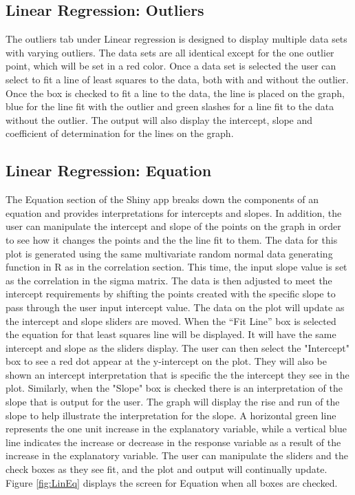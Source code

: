 \documentclass[11pt]{book}
\begin{document}
\subsection{Linear Regression: Outliers}
 
 The outliers tab under Linear regression is designed to display multiple data sets with varying outliers.  The data sets are all identical except for the one outlier point, which will be set in a red color.  Once a data set is selected the user can select to fit a line of least squares to the data, both with and without the outlier.  Once the box is checked to fit a line to the data, the line is placed on the graph, blue for the line fit with the outlier and green slashes for a line fit to the data without the outlier. The output will also display the intercept, slope and coefficient of determination for the lines on the graph.  
 

\subsection{Linear Regression: Equation}

The Equation section of the Shiny app breaks down the components of an equation and provides interpretations for intercepts and slopes.  In addition, the user can manipulate the intercept and slope of the points on the graph in order to see how it changes the points and the the line fit to them.  The data for this plot is generated using the same multivariate random normal data generating function in R as in the correlation section. This time, the input slope value is set as the correlation in the sigma matrix. The data is then adjusted to meet the intercept requirements by shifting the points created with the specific slope to pass through the user input intercept value. The data on the plot will update as the intercept and slope sliders are moved.  When the  ``Fit Line'' box is selected the equation for that least squares line will be displayed. It will have the same intercept and slope as the sliders display. The user can then select the "Intercept" box to see a red dot appear at the y-intercept on the plot. They will also be shown an intercept interpretation that is specific the the intercept they see in the plot. Similarly, when the "Slope" box is checked there is an interpretation of the slope that is output for the user.  The graph will display the rise and run of the slope to help illustrate the interpretation for the slope. A horizontal green line represents the one unit increase in the explanatory variable, while a vertical blue line indicates the increase or decrease in the response variable as a result of the increase in the explanatory variable. The user can manipulate the sliders and the check boxes as they see fit, and the plot and output will continually update. Figure \ref{fig:LinEq} displays the screen for Equation when all boxes are checked. 
\end{document}
